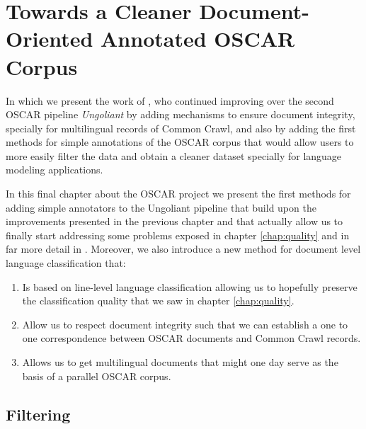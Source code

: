 \chapter{Towards a Cleaner Document-Oriented Annotated OSCAR Corpus}

\begin{center}
    \begin{minipage}{0.66\textwidth}
        \begin{small}
            In which we present the work of \citet{abadji-etal-2022-towards}, who continued improving over the second OSCAR pipeline \emph{Ungoliant} by adding mechanisms to ensure document integrity, specially for multilingual records of Common Crawl, and also by adding the first methods for simple annotations of the OSCAR corpus that would allow users to more easily filter the data and obtain a cleaner dataset specially for language modeling applications.
        \end{small}
    \end{minipage}
    \vspace{0.5cm}
\end{center}

In this final chapter about the OSCAR project we present the first methods for adding simple annotators to the Ungoliant pipeline that build upon the improvements presented in the previous chapter and that actually allow us to finally start addressing some problems exposed in chapter \ref{chap:quality} and in far more detail in \citep{caswell-etal-2020-language,kreutzer-etal-2021-quality}. Moreover, we also introduce a new method for document level language classification that:

\begin{enumerate}
    \item Is based on line-level language classification allowing us to hopefully preserve the classification quality that we saw in chapter \ref{chap:quality}.
    \item Allow us to respect document integrity such that we can establish a one to one correspondence between OSCAR documents and Common Crawl records.
    \item Allows us to get multilingual documents that might one day serve as the basis of a parallel OSCAR corpus.
\end{enumerate}

\section{Filtering}


